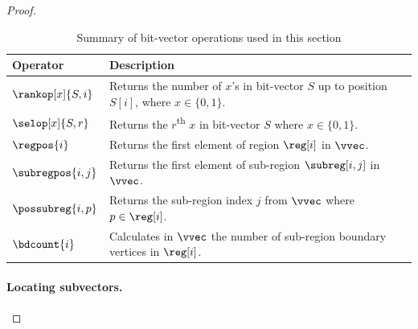 \begin{proof}
\begin{table}[ht]
	\centering
		\begin{tabular}{ l | l}
			Operator & Description \\ \hline
			$\rankop[x]{S, i}$ & Returns the number of $x$'s in bit-vector $S$ up to
				position $S[i]$, where $x \in \{0,1\}$.\\
			$\selop[x]{S, r}$ & Returns the $r$\textsuperscript{th} $x$ in bit-vector $S$
				where $x \in \{0,1\}$.\\
			$\regpos{i}$ & Returns the first element of region $\reg[i]$ in $\vvec$. \\
			$\subregpos{i,j}$ & Returns the first element of sub-region $\subreg[i,j]$
				in $\vvec$. \\
			$\possubreg{i,p}$ & Returns the sub-region index $j$ from $\vvec$ where
				$p \in \reg[i]$. \\
			$\bdcount{i}$ & Calculates in $\vvec$ the number of sub-region boundary vertices
				in $\reg[i]$. \\ \hline
		\end{tabular}
	\caption{Summary of bit-vector operations used in this section }
	\label{tab:succ_operators}
\end{table}

  \paragraph{Locating subvectors.}


\end{proof}

